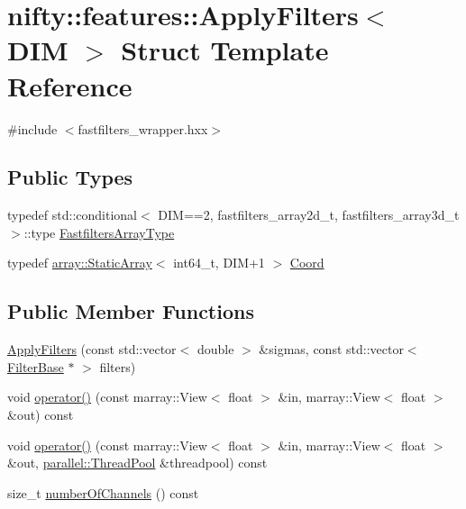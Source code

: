 \hypertarget{structnifty_1_1features_1_1ApplyFilters}{}\section{nifty\+:\+:features\+:\+:Apply\+Filters$<$ D\+I\+M $>$ Struct Template Reference}
\label{structnifty_1_1features_1_1ApplyFilters}


{\ttfamily \#include $<$fastfilters\+\_\+wrapper.\+hxx$>$}

\subsection*{Public Types}
\begin{DoxyCompactItemize}
\item 
typedef std\+::conditional$<$ D\+I\+M==2, fastfilters\+\_\+array2d\+\_\+t, fastfilters\+\_\+array3d\+\_\+t $>$\+::type \hyperlink{structnifty_1_1features_1_1ApplyFilters_adfddd3f0fdaa0179cc23100901565774}{Fastfilters\+Array\+Type}
\item 
typedef \hyperlink{namespacenifty_1_1array_a683f151f19c851754e0c6d55ed16a0c2}{array\+::\+Static\+Array}$<$ int64\+\_\+t, D\+I\+M+1 $>$ \hyperlink{structnifty_1_1features_1_1ApplyFilters_a0a26d161f300b3394044f1357ae5ebfd}{Coord}
\end{DoxyCompactItemize}
\subsection*{Public Member Functions}
\begin{DoxyCompactItemize}
\item 
\hyperlink{structnifty_1_1features_1_1ApplyFilters_a21bb107c65ee2783993d6de3170d2922}{Apply\+Filters} (const std\+::vector$<$ double $>$ \&sigmas, const std\+::vector$<$ \hyperlink{structnifty_1_1features_1_1FilterBase}{Filter\+Base} $\ast$ $>$ filters)
\item 
void \hyperlink{structnifty_1_1features_1_1ApplyFilters_a075f9232abd8d323ba121b2bdd49fa17}{operator()} (const marray\+::\+View$<$ float $>$ \&in, marray\+::\+View$<$ float $>$ \&out) const 
\item 
void \hyperlink{structnifty_1_1features_1_1ApplyFilters_a6fc96c356178496a7b6c08c8e429dead}{operator()} (const marray\+::\+View$<$ float $>$ \&in, marray\+::\+View$<$ float $>$ \&out, \hyperlink{classnifty_1_1parallel_1_1ThreadPool}{parallel\+::\+Thread\+Pool} \&threadpool) const 
\item 
size\+\_\+t \hyperlink{structnifty_1_1features_1_1ApplyFilters_afb7d56d68a25b2aaf2de29e3d6f39cff}{number\+Of\+Channels} () const 
\end{DoxyCompactItemize}


